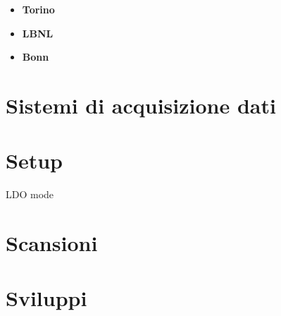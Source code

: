 \begin{itemize}
\item \textbf{Torino}
\item \textbf{LBNL}
\item \textbf{Bonn}
\end{itemize}

\section{Sistemi di acquisizione dati}


\section{Setup}
LDO mode
%
\section{Scansioni}


\section{Sviluppi}